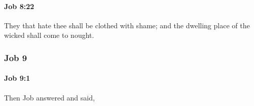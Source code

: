 		\paragraph{Job 8:22} %
			\label{JOB-8-22}

			They that hate thee shall be clothed with shame; and the dwelling place of the wicked shall come to nought.

	\subsubsection{Job 9} %
		\label{JOB-9}

		\paragraph{Job 9:1} %
			\label{JOB-9-1}

			Then Job answered and said,


